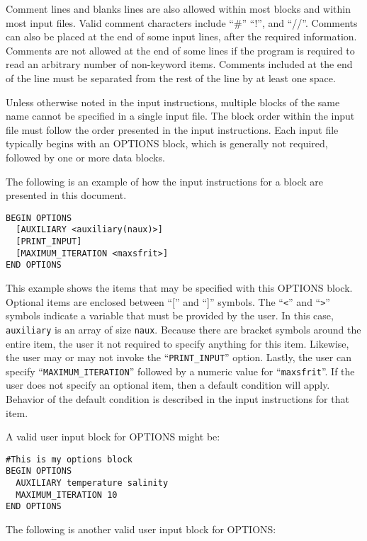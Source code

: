 Comment lines and blanks lines are also allowed within most blocks and within most input files.  Valid comment characters include ``\#'' ``!'', and ``//''.  Comments can also be placed at the end of some input lines, after the required information.  Comments are not allowed at the end of some lines if the program is required to read an arbitrary number of non-keyword items.  Comments included at the end of the line must be separated from the rest of the line by at least one space.

Unless otherwise noted in the input instructions, multiple blocks of the same name cannot be specified in a single input file.  The block order within the input file must follow the order presented in the input instructions.  Each input file typically begins with an OPTIONS block, which is generally not required, followed by one or more data blocks.

The following is an example of how the input instructions for a block are presented in this document.  
\begin{lstlisting}[style=blockdefinition]
BEGIN OPTIONS
  [AUXILIARY <auxiliary(naux)>]
  [PRINT_INPUT]
  [MAXIMUM_ITERATION <maxsfrit>]
END OPTIONS
\end{lstlisting}
This example shows the items that may be specified with this OPTIONS block.  Optional items are enclosed between ``['' and ``]'' symbols.  The ``\texttt{<}'' and ``\texttt{>}'' symbols indicate a variable that must be provided by the user.  In this case, \texttt{auxiliary} is an array of size \texttt{naux}.  Because there are bracket symbols around the entire item, the user it not required to specify anything for this item.  Likewise, the user may or may not invoke the ``\texttt{PRINT\_INPUT}'' option.  Lastly, the user can specify ``\texttt{MAXIMUM\_ITERATION}'' followed by a numeric value for ``\texttt{maxsfrit}''.  If the user does not specify an optional item, then a default condition will apply.  Behavior of the default condition is described in the input instructions for that item.

\vspace{6pt}\noindent A valid user input block for OPTIONS might be:

\begin{lstlisting}[style=inputfile]
#This is my options block
BEGIN OPTIONS
  AUXILIARY temperature salinity
  MAXIMUM_ITERATION 10
END OPTIONS
\end{lstlisting}

\noindent The following is another valid user input block for OPTIONS:

